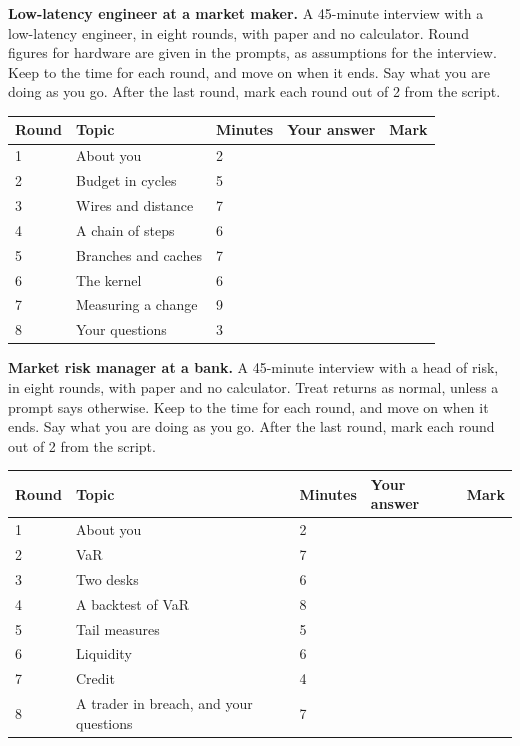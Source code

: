 \vfill\clearpage
\begin{question}\label{iq:iv2:mock-interviews:8}
\textbf{Low-latency engineer at a market maker.} A 45-minute interview with a low-latency engineer, in eight rounds, with paper and no calculator. Round figures for hardware are given in the prompts, as assumptions for the interview. Keep to the time for each round, and move on when it ends. Say what you are doing as you go. After the last round, mark each round out of 2 from the script.

\medskip
\begin{tabular}{@{}l|l|l|l|l@{}}
Round & Topic & Minutes & Your answer & Mark \\ \hline
1 & About you & 2 & & \\[6pt]\hline
2 & Budget in cycles & 5 & & \\[6pt]\hline
3 & Wires and distance & 7 & & \\[6pt]\hline
4 & A chain of steps & 6 & & \\[6pt]\hline
5 & Branches and caches & 7 & & \\[6pt]\hline
6 & The kernel & 6 & & \\[6pt]\hline
7 & Measuring a change & 9 & & \\[6pt]\hline
8 & Your questions & 3 & & \\[6pt]\hline
\end{tabular}
\end{question}

\vfill\clearpage
\begin{question}\label{iq:iv2:mock-interviews:9}
\textbf{Market risk manager at a bank.} A 45-minute interview with a head of risk, in eight rounds, with paper and no calculator. Treat returns as normal, unless a prompt says otherwise. Keep to the time for each round, and move on when it ends. Say what you are doing as you go. After the last round, mark each round out of 2 from the script.

\medskip
\begin{tabular}{@{}l|l|l|l|l@{}}
Round & Topic & Minutes & Your answer & Mark \\ \hline
1 & About you & 2 & & \\[6pt]\hline
2 & VaR & 7 & & \\[6pt]\hline
3 & Two desks & 6 & & \\[6pt]\hline
4 & A backtest of VaR & 8 & & \\[6pt]\hline
5 & Tail measures & 5 & & \\[6pt]\hline
6 & Liquidity & 6 & & \\[6pt]\hline
7 & Credit & 4 & & \\[6pt]\hline
8 & A trader in breach, and your questions & 7 & & \\[6pt]\hline
\end{tabular}
\end{question}

